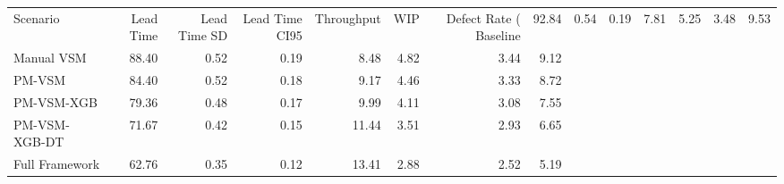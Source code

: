 \begin{tabular}{lrrrrrrr}
\toprule
Scenario & Lead Time & Lead Time SD & Lead Time CI95 & Throughput & WIP & Defect Rate (%
\midrule
Baseline & 92.84 & 0.54 & 0.19 & 7.81 & 5.25 & 3.48 & 9.53 \\
Manual VSM & 88.40 & 0.52 & 0.19 & 8.48 & 4.82 & 3.44 & 9.12 \\
PM-VSM & 84.40 & 0.52 & 0.18 & 9.17 & 4.46 & 3.33 & 8.72 \\
PM-VSM-XGB & 79.36 & 0.48 & 0.17 & 9.99 & 4.11 & 3.08 & 7.55 \\
PM-VSM-XGB-DT & 71.67 & 0.42 & 0.15 & 11.44 & 3.51 & 2.93 & 6.65 \\
Full Framework & 62.76 & 0.35 & 0.12 & 13.41 & 2.88 & 2.52 & 5.19 \\
\bottomrule
\end{tabular}
